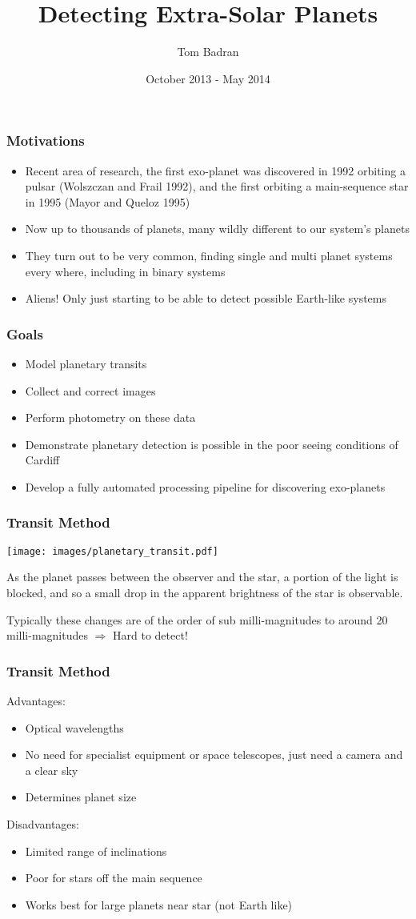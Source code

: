\documentclass{beamer}
\title{Detecting Extra-Solar Planets}
\author{Tom Badran}
\date{October 2013 - May 2014}
\begin{document}
\frame{\titlepage}
  \begin{frame}
    \frametitle{Motivations}
    \begin{itemize}
        \item Recent area of research, the first exo-planet was discovered in 1992 orbiting a pulsar (Wolszczan and Frail 1992), and the first orbiting a main-sequence star in 1995 (Mayor and Queloz 1995)
        \item Now up to thousands of planets, many wildly different to our system's planets
        \item They turn out to be very common, finding single and multi planet systems every where, including in binary systems
        \item Aliens! Only just starting to be able to detect possible Earth-like systems
    \end{itemize}
  \end{frame}
  \begin{frame}
    \frametitle{Goals}
    \begin{itemize}
        \item Model planetary transits
        \item Collect and correct images
        \item Perform photometry on these data
        \item Demonstrate planetary detection is possible in the poor seeing conditions of Cardiff
        \item Develop a fully automated processing pipeline for discovering exo-planets
    \end{itemize}
  \end{frame}
  \begin{frame}
    \frametitle{Transit Method}
    \begin{center}
    \texttt{[image: images/planetary\_transit.pdf]}
    \end{center}
    As the planet passes between the observer and the star, a portion of the light is blocked, and so a small drop in the apparent brightness of the star is observable.

    Typically these changes are of the order of sub milli-magnitudes to around 20 milli-magnitudes $\Rightarrow$ Hard to detect!
  \end{frame}
  \begin{frame}
    \frametitle{Transit Method}
    Advantages:
    \begin{itemize}
        \item Optical wavelengths
        \item No need for specialist equipment or space telescopes, just need a camera and a clear sky
        \item Determines planet size
    \end{itemize}
    Disadvantages:
    \begin{itemize}
        \item Limited range of inclinations
        \item Poor for stars off the main sequence
        \item Works best for large planets near star (not Earth like)
    \end{itemize}
  \end{frame}
\end{document}
